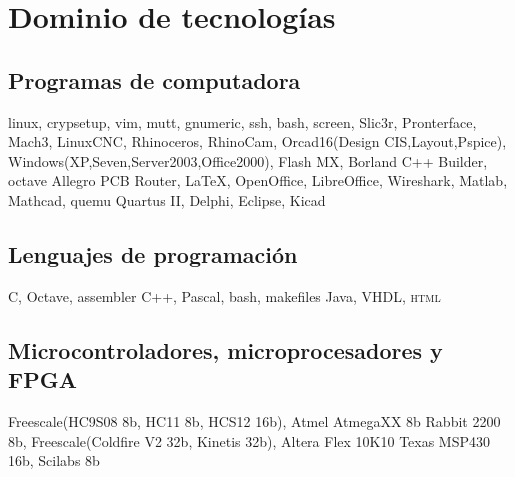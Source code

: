 \documentclass[11pt,a4paper,sans]{moderncv} 	%
\begin{document}
\section{Dominio de tecnologías}
	\subsection{Programas de computadora}
	 	{linux, crypsetup, vim, mutt, gnumeric, ssh, bash, screen, Slic3r, Pronterface, Mach3, LinuxCNC, Rhinoceros, RhinoCam, Orcad16(Design CIS,Layout,Pspice), Windows(XP,Seven,Server2003,Office2000), Flash MX, Borland C++ Builder, octave}
	 	{Allegro PCB Router, \LaTeX, OpenOffice, LibreOffice, Wireshark, Matlab, Mathcad, quemu}
	 	{Quartus II, Delphi, Eclipse, Kicad}

	\subsection{Lenguajes de programación}
	 	{C, Octave, assembler}
	 	{C++, Pascal, bash, makefiles}
	 	{Java, VHDL, \textsc{html}}

	\subsection{Microcontroladores, microprocesadores y FPGA}
	 	{Freescale(HC9S08 8b, HC11 8b, HCS12 16b), Atmel AtmegaXX 8b}
	 	{Rabbit 2200 8b, Freescale(Coldfire V2 32b, Kinetis 32b), Altera Flex 10K10}
	 	{Texas MSP430 16b, Scilabs 8b}
\end{document}
